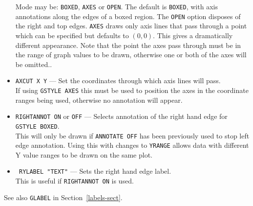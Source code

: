\documentclass[a4paper,twoside,11pt]{article}
\newcommand{\newpara}{\par\vspace{4mm}\noindent}
\newcommand{\textttc}[1]{\texttt{\textcolor{OurRed}{#1}}}
\begin{document}
\begin{itemize}
	Mode may be:
	\texttt{BOXED}, \texttt{AXES} or \texttt{OPEN}. The default is \texttt{BOXED}, with axis annotations along the
	edges of a boxed region. The \texttt{OPEN} option disposes of the right and top edges.
	\texttt{AXES} draws only axis lines that pass through a point which can be specified but defaults to $(0,0)$. This
	gives a dramatically different appearance. Note that the point the axes pass through must be in the range of
	graph values to be drawn, otherwise one or both of the axes will be omitted..
\item \textttc{AXCUT X Y} --- Set the coordinates through which axis lines will pass. \\
	If using \texttt{GSTYLE AXES} this must
	be used to position the axes in the coordinate ranges being used, otherwise no annotation will appear.
\item \textttc{RIGHTANNOT ON} or \texttt{OFF} --- Selects annotation of the right hand edge for \texttt{GSTYLE BOXED}. \\
	This will
	only be drawn if \texttt{ANNOTATE OFF} has been previously used to stop left edge annotation. Using this with changes to 
	\texttt{YRANGE} allows data with different Y value ranges to be drawn on the same plot.
\item \textttc{ RYLABEL "TEXT"} --- Sets the right hand edge label.\\
	This is useful if \texttt{RIGHTANNOT ON} is used.
\end{itemize}

\newpara      
See also \texttt{GLABEL} in Section~\ref{labels-sect}.
\end{document}
